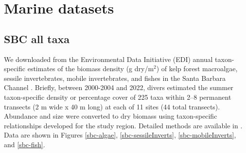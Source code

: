 \documentclass[11pt, oneside]{article}
\begin{document}
%


\section {Marine datasets}

%
%


%
\subsection {SBC all taxa}
We downloaded from the Environmental Data Initiative (EDI) annual taxon-specific estimates of the biomass density (g dry/m$^2$) of kelp forest macroalgae, sessile invertebrates, mobile invertebrates, and fishes in the Santa Barbara Channel \citep{sbc}.
Briefly, between 2000-2004 and 2022, divers estimated the summer taxon-specific density or percentage cover of 225 taxa within 2–8 permanent transects (2 m wide x 40 m long) at each of 11 sites (44 total transects). 
Abundance and size were converted to dry biomass using taxon-specific relationships developed for the study region. 
Detailed methods are available in \citep{Harrer2013, Reed2016, sbc}.
Data are shown in Figures \ref{sbc-algae},  \ref{sbc-sessileInverts}, \ref{sbc-mobileInverts}, and \ref{sbc-fish}.
\end{document}

